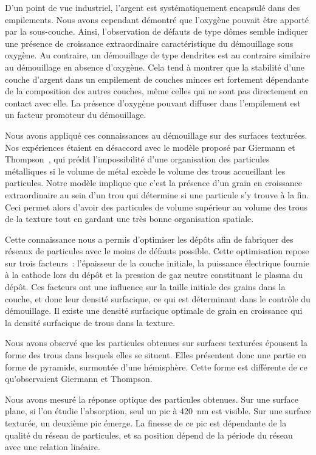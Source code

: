 D'un point de vue industriel, l'argent est systématiquement encapsulé dans des empilements. Nous avons cependant démontré que l'oxygène pouvait être apporté par la sous-couche. Ainsi, l'observation de défauts de type \og dômes \fg{} semble indiquer une présence de croissance extraordinaire caractéristique du démouillage sous oxygène. Au contraire, un démouillage de type \og dendrites \fg{} est au contraire similaire au démouillage en absence d'oxygène. Cela tend à montrer que la stabilité d'une couche d'argent dans un empilement de couches minces est fortement dépendante de la composition des autres couches, même celles qui ne sont pas directement en contact avec elle. La présence d'oxygène pouvant diffuser dans l'empilement est un facteur promoteur du démouillage.\par \vspace{12pt}
Nous avons appliqué ces connaissances au démouillage sur des surfaces texturées. Nos expériences étaient en désaccord avec le modèle proposé par Giermann et Thompson~\cite{giermann2005solid, giermann2011requirements}, qui prédit l'impossibilité d'une organisation des particules métalliques si le volume de métal excède le volume des trous accueillant les particules. Notre modèle implique que c'est la présence d'un grain en croissance extraordinaire au sein d'un trou qui détermine si une particule s'y trouve à la fin. Ceci permet alors d'avoir des particules de volume supérieur au volume des trous de la texture tout en gardant une très bonne organisation spatiale.\par 
Cette connaissance nous a permis d'optimiser les dépôts afin de fabriquer des réseaux de particules avec le moins de défauts possible. Cette optimisation repose sur trois facteurs~: l'épaisseur de la couche initiale, la puissance électrique fournie à la cathode lors du dépôt et la pression de gaz neutre constituant le plasma du dépôt. Ces facteurs ont une influence sur la taille initiale des grains dans la couche, et donc leur densité surfacique, ce qui est déterminant dans le contrôle du démouillage. Il existe une densité surfacique optimale de grain en croissance qui la densité surfacique de trous dans la texture.\par
Nous avons observé que les particules obtenues sur surfaces texturées épousent la forme des trous dans lesquels elles se situent. Elles présentent donc une partie en forme de pyramide, surmontée d'une hémisphère. Cette forme est différente de ce qu'observaient Giermann et Thompson.\par 
Nous avons mesuré la réponse optique des particules obtenues. Sur une surface plane, si l'on étudie l'absorption, seul un pic à 420~nm est visible. Sur une surface texturée, un deuxième pic émerge. La finesse de ce pic est dépendante de la qualité du réseau de particules, et sa position dépend de la période du réseau avec une relation linéaire. \par 
